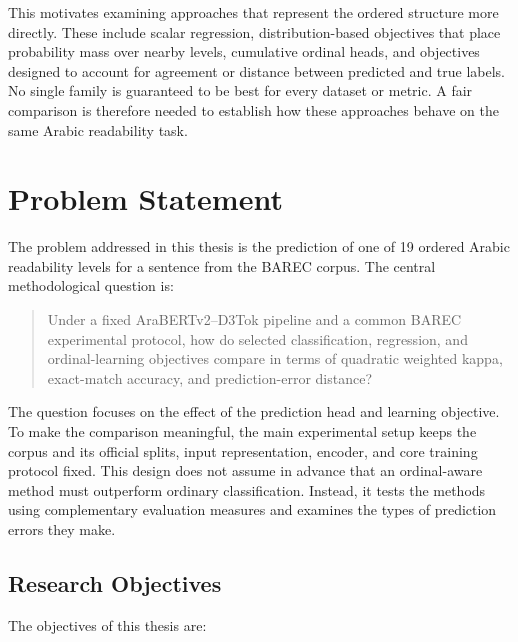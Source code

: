 \documentclass[12pt]{report}
\begin{document}
This motivates examining approaches that represent the ordered structure more directly. These include scalar regression, distribution-based objectives that place probability mass over nearby levels, cumulative ordinal heads, and objectives designed to account for agreement or distance between predicted and true labels. No single family is guaranteed to be best for every dataset or metric. A fair comparison is therefore needed to establish how these approaches behave on the same Arabic readability task.

\section{Problem Statement}

The problem addressed in this thesis is the prediction of one of 19 ordered Arabic readability levels for a sentence from the BAREC corpus. The central methodological question is:

\begin{quote}
Under a fixed AraBERTv2--D3Tok pipeline and a common BAREC experimental protocol, how do selected classification, regression, and ordinal-learning objectives compare in terms of quadratic weighted kappa, exact-match accuracy, and prediction-error distance?
\end{quote}

The question focuses on the effect of the prediction head and learning objective. To make the comparison meaningful, the main experimental setup keeps the corpus and its official splits, input representation, encoder, and core training protocol fixed. This design does not assume in advance that an ordinal-aware method must outperform ordinary classification. Instead, it tests the methods using complementary evaluation measures and examines the types of prediction errors they make.

\subsection{Research Objectives}

The objectives of this thesis are:
\end{document}
